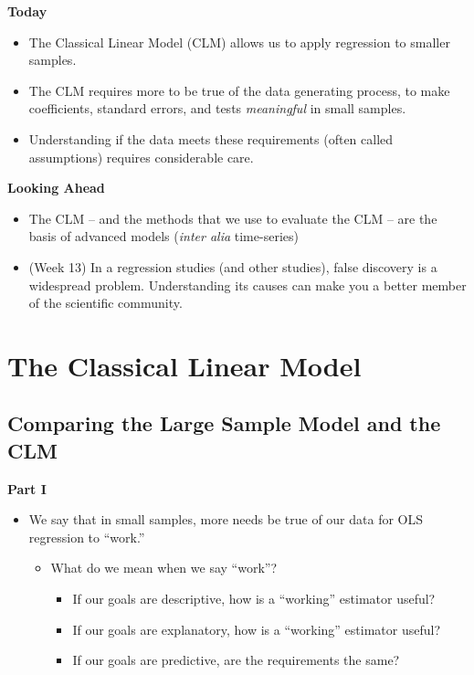 \documentclass[
]{book}
\providecommand{\tightlist}{%
  \setlength{\itemsep}{0pt}\setlength{\parskip}{0pt}}
\theoremstyle{definition}
\theoremstyle{definition}
\theoremstyle{definition}
\theoremstyle{definition}
\theoremstyle{remark}
\begin{document}
\textbf{Today}

\begin{itemize}
\tightlist
\item
  The Classical Linear Model (CLM) allows us to apply regression to smaller samples.
\item
  The CLM requires more to be true of the data generating process, to make coefficients, standard errors, and tests \emph{meaningful} in small samples.
\item
  Understanding if the data meets these requirements (often called assumptions) requires considerable care.
\end{itemize}

\textbf{Looking Ahead}

\begin{itemize}
\tightlist
\item
  The CLM -- and the methods that we use to evaluate the CLM -- are the basis of advanced models (\emph{inter alia} time-series)
\item
  (Week 13) In a regression studies (and other studies), false discovery is a widespread problem. Understanding its causes can make you a better member of the scientific community.
\end{itemize}

\hypertarget{the-classical-linear-model-1}{%
\section{The Classical Linear Model}\label{the-classical-linear-model-1}}

\hypertarget{comparing-the-large-sample-model-and-the-clm}{%
\subsection{Comparing the Large Sample Model and the CLM}\label{comparing-the-large-sample-model-and-the-clm}}

\textbf{Part I}

\begin{itemize}
\tightlist
\item
  We say that in small samples, more needs be true of our data for OLS regression to ``work.''

  \begin{itemize}
  \tightlist
  \item
    What do we mean when we say ``work''?

    \begin{itemize}
    \tightlist
    \item
      If our goals are descriptive, how is a ``working'' estimator useful?
    \item
      If our goals are explanatory, how is a ``working'' estimator useful?
    \item
      If our goals are predictive, are the requirements the same?
    \end{itemize}
  \end{itemize}
\end{itemize}
\end{document}
